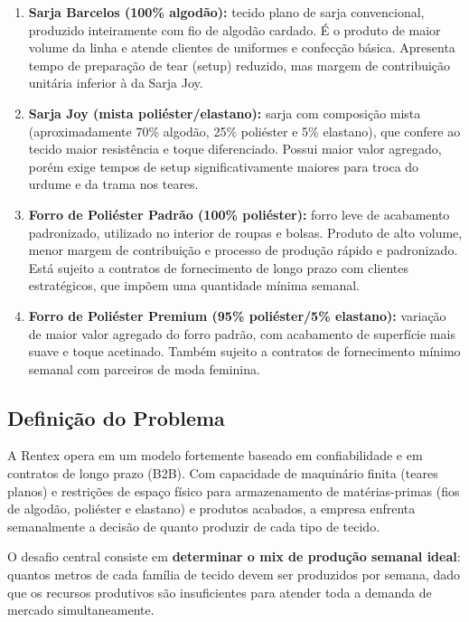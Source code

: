 \begin{enumerate}[label=\textbf{(\arabic*)}]
  \item \textbf{Sarja Barcelos (100\% algodão):} tecido plano de sarja convencional,
        produzido inteiramente com fio de algodão cardado. É o produto de maior
        volume da linha e atende clientes de uniformes e confecção básica.
        Apresenta tempo de preparação de tear (setup) reduzido, mas margem de
        contribuição unitária inferior à da Sarja Joy.

  \item \textbf{Sarja Joy (mista poliéster/elastano):} sarja com composição mista
        (aproximadamente 70\% algodão, 25\% poliéster e 5\% elastano), que confere
        ao tecido maior resistência e toque diferenciado. Possui maior valor
        agregado, porém exige tempos de setup significativamente maiores para
        troca do urdume e da trama nos teares.

  \item \textbf{Forro de Poliéster Padrão (100\% poliéster):} forro leve de
        acabamento padronizado, utilizado no interior de roupas e bolsas. Produto
        de alto volume, menor margem de contribuição e processo de produção rápido
        e padronizado. Está sujeito a contratos de fornecimento de longo prazo com
        clientes estratégicos, que impõem uma quantidade mínima semanal.

  \item \textbf{Forro de Poliéster Premium (95\% poliéster/5\% elastano):} variação
        de maior valor agregado do forro padrão, com acabamento de superfície mais
        suave e toque acetinado. Também sujeito a contratos de fornecimento
        mínimo semanal com parceiros de moda feminina.
\end{enumerate}

\subsection{Definição do Problema}

A Rentex opera em um modelo fortemente baseado em confiabilidade e em contratos
de longo prazo (B2B). Com capacidade de maquinário finita (teares planos) e
restrições de espaço físico para armazenamento de matérias-primas (fios de
algodão, poliéster e elastano) e produtos acabados, a empresa enfrenta
semanalmente a decisão de quanto produzir de cada tipo de tecido.

O desafio central consiste em \textbf{determinar o mix de produção semanal ideal}:
quantos metros de cada família de tecido devem ser produzidos por semana, dado
que os recursos produtivos são insuficientes para atender toda a demanda
de mercado simultaneamente.

